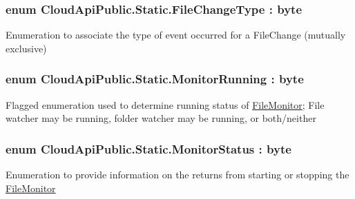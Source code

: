 \hypertarget{namespace_cloud_api_public_1_1_static_a08ff1fddb1dc38f7b861b0fd106834be}{
\subsubsection[{File\-Change\-Type}]{\setlength{\rightskip}{0pt plus 5cm}enum {\bf Cloud\-Api\-Public.\-Static.\-File\-Change\-Type} \-: byte}}\label{namespace_cloud_api_public_1_1_static_a08ff1fddb1dc38f7b861b0fd106834be}


Enumeration to associate the type of event occurred for a File\-Change (mutually exclusive) 

\hypertarget{namespace_cloud_api_public_1_1_static_a502726756c6bc84b5c9bcaf23c3a8d28}{
\subsubsection[{Monitor\-Running}]{\setlength{\rightskip}{0pt plus 5cm}enum {\bf Cloud\-Api\-Public.\-Static.\-Monitor\-Running} \-: byte}}\label{namespace_cloud_api_public_1_1_static_a502726756c6bc84b5c9bcaf23c3a8d28}


Flagged enumeration used to determine running status of \hyperlink{namespace_cloud_api_public_1_1_file_monitor}{File\-Monitor}; File watcher may be running, folder watcher may be running, or both/neither 

\hypertarget{namespace_cloud_api_public_1_1_static_a31db95951688473984962a22ad05a45f}{
\subsubsection[{Monitor\-Status}]{\setlength{\rightskip}{0pt plus 5cm}enum {\bf Cloud\-Api\-Public.\-Static.\-Monitor\-Status} \-: byte}}\label{namespace_cloud_api_public_1_1_static_a31db95951688473984962a22ad05a45f}


Enumeration to provide information on the returns from starting or stopping the \hyperlink{namespace_cloud_api_public_1_1_file_monitor}{File\-Monitor} 


